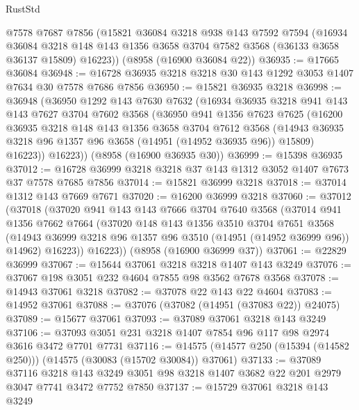 \begin{lexlean}{RustStd}
\begin{coremodule}
    @7578
    @7687
    @7856
    (@15821
      @36084
      @3218
      @938
      @143
      @7592
      @7594
      (@16934
        @36084
        @3218
        @148
        @143
        @1356
        @3658
        @3704
        @7582
        @3568
        (@36133 @3658 @36137 @15809)
        @16223))
    (@8958 (@16900 @36084 @22))
@36935 := @17665 @36084
@36948 := @16728 @36935 @3218 @3218 @30 @143 @1292 @3053 @1407 @7634 @30 @7578 @7686 @7856
@36950 := @15821 @36935 @3218
@36998 := @36948
    (@36950
      @1292
      @143
      @7630
      @7632
      (@16934
        @36935
        @3218
        @941
        @143
        @143
        @7627
        @3704
        @7602
        @3568
        (@36950
          @941
          @1356
          @7623
          @7625
          (@16200
            @36935
            @3218
            @148
            @143
            @1356
            @3658
            @3704
            @7612
            @3568
            (@14943 @36935 @3218 @96 @1357 @96 @3658 (@14951 (@14952 @36935 @96)) @15809)
            @16223))
        @16223))
    (@8958 (@16900 @36935 @30))
@36999 := @15398 @36935
@37012 := @16728 @36999 @3218 @3218 @37 @143 @1312 @3052 @1407 @7673 @37 @7578 @7685 @7856
@37014 := @15821 @36999 @3218
@37018 := @37014 @1312 @143 @7669 @7671
@37020 := @16200 @36999 @3218
@37060 := @37012
    (@37018
      (@37020
        @941
        @143
        @143
        @7666
        @3704
        @7640
        @3568
        (@37014
          @941
          @1356
          @7662
          @7664
          (@37020
            @148
            @143
            @1356
            @3510
            @3704
            @7651
            @3568
            (@14943 @36999 @3218 @96 @1357 @96 @3510 (@14951 (@14952 @36999 @96)) @14962)
            @16223))
        @16223))
    (@8958 (@16900 @36999 @37))
@37061 := @22829 @36999
@37067 := @15644 @37061 @3218 @3218 @1407 @143 @3249
@37076 := @37067 @198 @3051 @232 @4604 @7855 @98 @3562 @7678 @3568
@37078 := @14943 @37061 @3218
@37082 := @37078 @22 @143 @22 @4604
@37083 := @14952 @37061
@37088 := @37076 (@37082 (@14951 (@37083 @22)) @24075)
@37089 := @15677 @37061
@37093 := @37089 @37061 @3218 @143 @3249
@37106 := @37093 @3051 @231 @3218 @1407 @7854 @96 @117 @98 @2974 @3616 @3472 @7701 @7731
@37116 := @14575 (@14577 @250 (@15394 (@14582 @250))) (@14575 (@30083 (@15702 @30084)) @37061)
@37133 := @37089
    @37116
    @3218
    @143
    @3249
    @3051
    @98
    @3218
    @1407
    @3682
    @22
    @201
    @2979
    @3047
    @7741
    @3472
    @7752
    @7850
@37137 := @15729 @37061 @3218 @143 @3249

\end{coremodule}
\end{lexlean}

